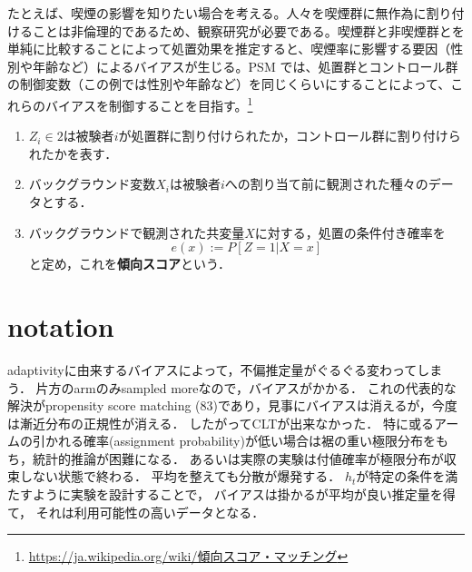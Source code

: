 \documentclass[uplatex,dvipdfmx]{jsreport}
\begin{document}
たとえば、喫煙の影響を知りたい場合を考える。人々を喫煙群に無作為に割り付けることは非倫理的であるため、観察研究が必要である。喫煙群と非喫煙群とを単純に比較することによって処置効果を推定すると、喫煙率に影響する要因（性別や年齢など）によるバイアスが生じる。PSM では、処置群とコントロール群の制御変数（この例では性別や年齢など）を同じくらいにすることによって、これらのバイアスを制御することを目指す。\footnote{\url{https://ja.wikipedia.org/wiki/傾向スコア・マッチング}}

\begin{definition}\mbox{}
    \begin{enumerate}
        \item $Z_i\in 2$は被験者$i$が処置群に割り付けられたか，コントロール群に割り付けられたかを表す．
        \item バックグラウンド変数$X_i$は被験者$i$への割り当て前に観測された種々のデータとする．
        \item バックグラウンドで観測された共変量$X$に対する，処置の条件付き確率を
        \[e(x):=P[Z=1|X=x]\]
        と定め，これを\textbf{傾向スコア}という．
    \end{enumerate}
\end{definition}

\section{notation}

\begin{tcolorbox}[colframe=ForestGreen, colback=ForestGreen!10!white,breakable,colbacktitle=ForestGreen!40!white,coltitle=black,fonttitle=\bfseries\sffamily,
title=RosenbaumとRubinを超えていく]
    adaptivityに由来するバイアスによって，不偏推定量がぐるぐる変わってしまう．
    片方のarmのみsampled moreなので，バイアスがかかる．
    これの代表的な解決がpropensity score matching (83)であり，見事にバイアスは消えるが，今度は漸近分布の正規性が消える．
    したがってCLTが出来なかった．
    特に或るアームの引かれる確率(assignment probability)が低い場合は裾の重い極限分布をもち，統計的推論が困難になる．
    あるいは実際の実験は付値確率が極限分布が収束しない状態で終わる．
    平均を整えても分散が爆発する．
    $h_t$が特定の条件を満たすように実験を設計することで，
    バイアスは掛かるが平均が良い推定量を得て，
    それは利用可能性の高いデータとなる．
\end{tcolorbox}
\end{document}
